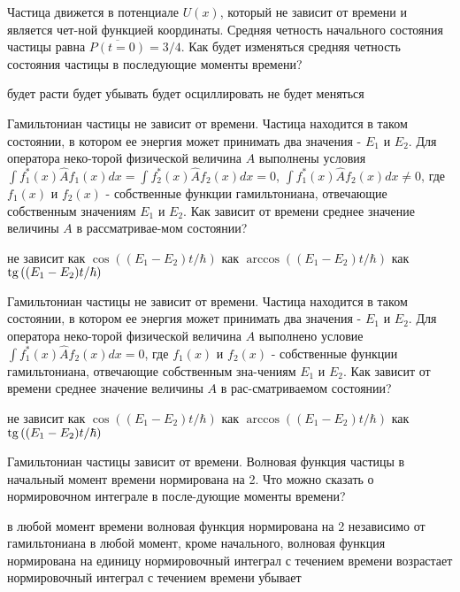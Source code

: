 \documentclass[11pt,a4paper]{exam}
\begin{document}
\begin{questions}
\question Частица движется в потенциале $U(x)$, который не зависит от времени и является чет-ной функцией координаты. Средняя четность начального состояния частицы равна $\overline {P(t = 0)}  = 3/4$. Как будет изменяться средняя четность состояния частицы в последующие моменты времени?
\begin{choices}
\choice будет расти           
\choice будет убывать   
\choice будет осциллировать         
\choice не будет меняться
\end{choices}

\question Гамильтониан частицы не зависит от времени. Частица находится в таком состоянии, в котором ее энергия может принимать два значения - ${E_1}$ и ${E_2}$. Для оператора неко-торой физической величина $A$ выполнены условия $\int {f_1^*(x)\hat A{f_1}(x)dx}  = \int {f_2^*(x)\hat A{f_2}(x)dx = 0} $, $\int {f_1^*(x)\hat A{f_2}(x)dx}  \ne 0$, где ${f_1}(x)$ и ${f_2}(x)$ - собственные функции гамильтониана, отвечающие собственным значениям ${E_1}$ и ${E_2}$. Как зависит от времени среднее значение величины $A$ в рассматривае-мом состоянии?
\begin{choices}
\choice не зависит            
\choice как $\cos \left( {({E_1} - {E_2})t/\hbar } \right)$
\choice как $\arccos \left( {({E_1} - {E_2})t/\hbar } \right)$    
\choice как ${\rm{tg}}\left( {({E_1} - {E_2})t/\hbar } \right)$
\end{choices}

\question Гамильтониан частицы не зависит от времени. Частица находится в таком состоянии, в котором ее энергия может принимать два значения - ${E_1}$ и ${E_2}$. Для оператора неко-торой физической величина $A$ выполнено условие $\int {f_1^*(x)\hat A{f_2}(x)dx}  = 0$, где ${f_1}(x)$ и ${f_2}(x)$ - собственные функции гамильтониана, отвечающие собственным зна-чениям ${E_1}$ и ${E_2}$. Как зависит от времени среднее значение величины $A$ в рас-сматриваемом состоянии?
\begin{choices}
\choice не зависит            
\choice как $\cos \left( {({E_1} - {E_2})t/\hbar } \right)$
\choice как $\arccos \left( {({E_1} - {E_2})t/\hbar } \right)$    
\choice как ${\rm{tg}}\left( {({E_1} - {E_2})t/\hbar } \right)$
\end{choices}

\question Гамильтониан частицы зависит от времени. Волновая функция частицы в начальный момент времени нормирована на 2. Что можно сказать о нормировочном интеграле в после-дующие моменты времени?
\begin{choices}
\choice в любой момент времени волновая функция нормирована на 2 независимо от гамильтониана
\choice в любой момент, кроме начального, волновая функция нормирована на единицу
\choice нормировочный интеграл с течением времени возрастает
\choice нормировочный интеграл с течением времени убывает
\end{choices}


\end{questions}
\end{document}
